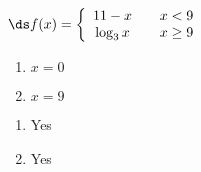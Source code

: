{$\ds f(x) = \left\{\begin{array}{ccc}
11-x		& &  x<9\\
\log_3 x & & x\geq 9
\end{array}\right.
$
\begin{enumerate}
\item		$x=0$
\item		$x=9$
\end{enumerate}
}
{\begin{enumerate}
\item		Yes
\item		Yes
\end{enumerate}
}
